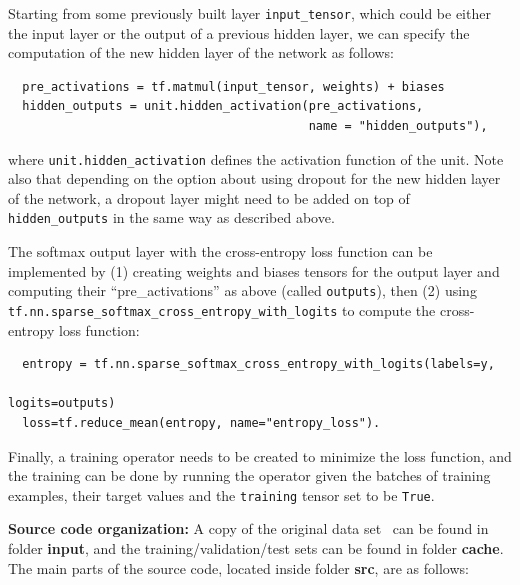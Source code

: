 \documentclass[12pt]{article}
\begin{document}
Starting from some previously built layer \texttt{input\_tensor}, which could be either the input layer or the output of a previous hidden layer, we can specify the computation of the new hidden layer of the network as follows:
\begin{verbatim}
  pre_activations = tf.matmul(input_tensor, weights) + biases
  hidden_outputs = unit.hidden_activation(pre_activations, 
                                          name = "hidden_outputs"),
\end{verbatim}
\noindent
where \texttt{unit.hidden\_activation} defines the activation function of the unit. Note also that depending on the option about using dropout for the new hidden layer of the network, a dropout layer might need to be added on top of \texttt{hidden\_outputs} in the same way as described above.

The softmax output layer with the cross-entropy loss function can be implemented by (1) creating weights and biases tensors for the output layer and computing their ``pre\_activations'' as above (called \texttt{outputs}), then (2) using \texttt{tf.nn.sparse\_softmax\_cross\_entropy\_with\_logits} to compute the cross-entropy loss function:
\begin{verbatim}
  entropy = tf.nn.sparse_softmax_cross_entropy_with_logits(labels=y, 
                                                           logits=outputs)
  loss=tf.reduce_mean(entropy, name="entropy_loss").
\end{verbatim}

Finally, a training operator needs to be created to minimize the loss function, and the training can be done by running the operator given the batches of training examples, their target values and the \texttt{training} tensor set to be \texttt{True}.

\vspace{5mm}
\noindent
\textbf{Source code organization:} A copy of the original data set~\cite{andrzejak2001indications} can be found in folder \textbf{input}, and the training/validation/test sets can be found in folder \textbf{cache}. The main parts of the source code, located inside folder \textbf{src}, are as follows:
\end{document}

